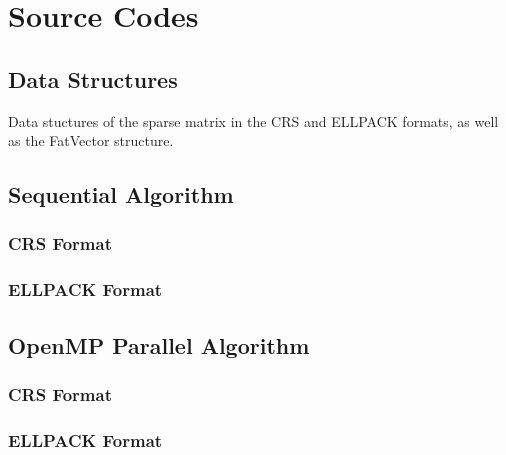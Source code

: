 \documentclass[12pt,oneside]{book} %
\begin{document}
\chapter{Source Codes}
\begin{subappendices}
    \section{Data Structures}\label{appendix:data-structures}
    Data stuctures of the sparse matrix in the CRS and ELLPACK formats, as well as
    the FatVector structure. 

    \newpage
    \section{Sequential Algorithm}\label{appendix:sequential}
    \subsection{CRS Format}\label{appendix:crs-sequential}
    

    \subsection{ELLPACK Format}\label{appendix:ellpack-sequential}
    

    \newpage
    \section{OpenMP Parallel Algorithm}\label{appendix:openmp}
    \subsection{CRS Format}\label{appendix:crs-openmp}
    

    \subsection{ELLPACK Format}\label{appendix:ellpack-openmp}
    

    \newpage

\end{subappendices}
\end{document}

